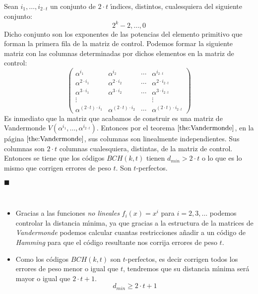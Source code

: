 Sean $i_{1},\dots,i_{2\cdot t}$ un conjunto de $2\cdot t$ \'{\i}ndices,
distintos, cualesquiera del siguiente conjunto: $$2^k-2,\dots,0$$
Dicho conjunto son los exponentes de las potencias del elemento primitivo que
forman la primera fila de la matriz de control. Podemos formar la siguiente
matriz con las columnas determinadas por dichos elementos en la matriz de 
control:
\begin{displaymath}
\left( \begin{array}{cccc}
\alpha^{i_1}&\alpha^{i_2}&\cdots&\alpha^{i_{2\cdot t}}\\
\alpha^{2\cdot i_1}&\alpha^{2\cdot i_2}&\cdots&\alpha^{2\cdot i_{2\cdot t}}\\
\alpha^{3\cdot i_1}&\alpha^{3\cdot i_2}&\cdots&\alpha^{3\cdot i_{2\cdot t}}\\
\vdots& & &\vdots\\
\alpha^{(2\cdot t)\cdot i_1}&\alpha^{(2\cdot t)\cdot i_2}&\cdots&
\alpha^{(2\cdot t)\cdot i_{2\cdot t}}
\end{array} \right)
\end{displaymath}
Es inmediato que la matriz que acabamos de construir es una matriz de
Vandermonde $V(\alpha^{i_1},\dots,\alpha^{i_{2\cdot t}})$. Entonces por el
teorema $\ref{the:Vandermonde}$, en la p\'agina $\pageref{the:Vandermonde}$,
sus columnas son linealmente independientes. Sus columnas son $2\cdot t$
columnas cualesquiera, distintas, de la matriz de control. Entonces
se tiene que los c\'odigos $BCH(k,t)$ tienen $d_{min}> 2\cdot t$ o lo que es lo
mismo que corrigen errores de peso $t$. Son $t$-perfectos.
\begin{flushright}
$\blacksquare$
\end{flushright}
%
\newpage
%
\begin{observacion}
\ \\
\begin{itemize}
\item Gracias a las funciones \emph{no lineales} $f_i(x)=x^i$ para $i=2,3,\dots$
podemos controlar la distancia m\'{\i}nima, ya que gracias a la estructura de
la matrices de \emph{Vandermonde} podemos calcular cuantas restricciones
a\~nadir a un c\'odigo de \emph{Hamming} para que el c\'odigo resultante nos
corrija errores de peso $t$.
\item Como los c\'odigos $BCH(k,t)$ son $t$-perfectos, es decir corrigen todos
los errores de peso menor o igual que $t$, tendremos que su distancia
m\'{\i}nima ser\'a mayor o igual que $2\cdot t+1$.
\begin{displaymath}
d_{min} \geq 2\cdot t+1
\end{displaymath}
\end{itemize}
\end{observacion}
